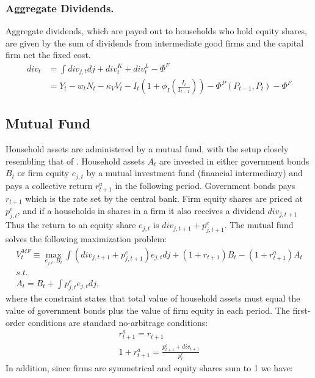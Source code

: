 \subsubsection*{Aggregate Dividends.}
Aggregate dividends, which are payed out to households who hold equity shares, are given by the sum of dividends from intermediate good firms and the capital firm net the fixed cost. 
\begin{align*}
div_{t}&=\int div_{j,t}dj+div_{t}^{K}+div_{t}^{L}  
-\Phi^{F} \\
&=
Y_{t}-w_{t}N_{t}-\kappa_{V}V_{t}-I_{t}\left(1+\phi_{I}\left(\frac{I_{t}}{I_{t-1}}\right)\right)-\Phi^{P}\left(P_{t-1},P_{t}\right) - \Phi^{F}
\end{align*}



\subsection{Mutual Fund}
Household assets are administered by a mutual fund, with the setup closely resembling that of \citet{auclert2020micro}. Household assets $A_t$ are invested in either government bonds $B_t$ or firm equity $e_{j,t}$ by a mutual investment fund (financial intermediary) and pays a collective return ${r}_{t+1}^{a}$ in the following period. Government bonds pays $r_{t+1}$ which is the rate set by the central bank.
Firm equity shares are priced at $p_{j,t}^{e}$, and if a households in shares in a firm it also receives a dividend $div_{j,t+1}$ Thus the return to an equity share $e_{j,t}$ is $div_{j,t+1}+p^e_{j,t+1}$. The mutual fund solves the following maximization problem:
\begin{gather*}
V_{t}^{MF}\equiv\max_{e_{j,t},B_{t}}\int\left(div_{j,t+1}+p_{j,t+1}^{e}\right)e_{j,t}dj+\left(1+r_{t+1}\right)B_{t}-\left(1+r_{t+1}^{a}\right)A_{t} \\
s.t. \\
A_{t} = B_{t}+\int p_{j,t}^{e}e_{j,t}dj,
\end{gather*}
where the constraint states that total value of household assets must equal the value of government bonds plus the value of firm equity in each period. 
The first-order conditions are standard no-arbitrage conditions: 
\begin{gather}
r_{t+1}^{a}=r_{t+1} \label{pG_FOC} \\
1+r_{t+1}^{a}=\frac{p_{t+1}^{e}+div_{t+1}}{p_{t}^{e}} \label{Equity_FOC}
\end{gather}
In addition, since firms are symmetrical and equity shares sum to 1 we have:
